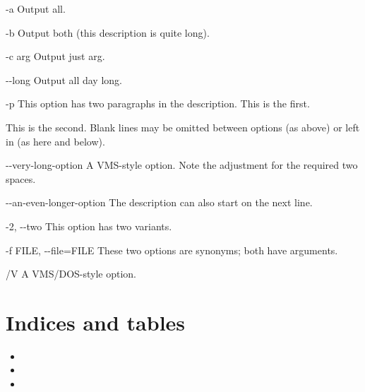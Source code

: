 \documentclass[letterpaper,10pt,english]{sphinxmanual}
\begin{document}
\begin{optionlist}{3cm}
\item [-a]  
Output all.
\item [-b]  
Output both (this description is
quite long).
\item [-c arg]  
Output just arg.
\item [-{-}long]  
Output all day long.
\item [-p]  
This option has two paragraphs in the description.
This is the first.

This is the second.  Blank lines may be omitted between
options (as above) or left in (as here and below).
\item [-{-}very-long-option]  
A VMS-style option.  Note the adjustment for
the required two spaces.
\item [-{-}an-even-longer-option]  
The description can also start on the next line.
\item [-2, -{-}two]  
This option has two variants.
\item [-f FILE, -{-}file=FILE]  
These two options are synonyms; both have
arguments.
\item [/V]  
A VMS/DOS-style option.
\end{optionlist}


\chapter{Indices and tables}
\label{\detokenize{index:indices-and-tables}}\begin{itemize}
\item {} 

\item {} 

\item {} 

\end{itemize}



\renewcommand{\indexname}{索引}
\footnotesize\raggedright\printindex
\end{document}
